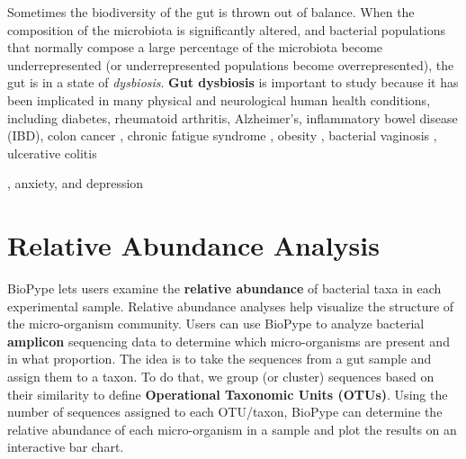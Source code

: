 Sometimes the biodiversity of the gut is thrown out of balance. When the composition of the microbiota is significantly altered, and bacterial populations that normally compose a large percentage of the microbiota become underrepresented (or underrepresented populations become overrepresented), the gut is in a state of \textit{dysbiosis}.
%
%
 \textbf{Gut dysbiosis} is important to study because it has been implicated in many physical and neurological human health conditions, including diabetes, rheumatoid arthritis, Alzheimer's, inflammatory bowel disease (IBD), colon cancer \citep{Buford2017, Kennedy2014, Castellarin2012},  chronic fatigue syndrome \citep{Lakhan2010}, obesity \citep{Turnbaugh2006,Turnbaugh2009}, bacterial vaginosis \citep{Africa2014}, ulcerative colitis {\citep{Mandal2015, Matsuoka2015}, anxiety, and depression \citep{Evrensel2015, Lach2018}
%
\section{Relative Abundance Analysis}
%
%
BioPype lets users examine the \textbf{relative abundance} of bacterial taxa in each experimental sample. Relative abundance analyses help visualize the structure of the micro-organism community. Users can use BioPype to analyze bacterial \textbf{amplicon} sequencing data to determine which micro-organisms are present and in what proportion.
%
%
The idea is to take the sequences from a gut sample and assign them to a taxon. To do that, we group (or cluster) sequences based on their similarity to define \textbf{Operational Taxonomic Units (OTUs)}. 
%
%
Using the number of sequences assigned to each OTU/taxon, BioPype can determine the relative abundance of each micro-organism in a sample and plot the results on an interactive bar chart.

}
